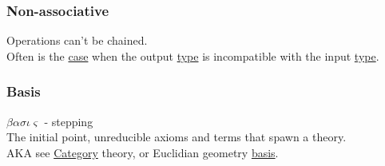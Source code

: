 \documentclass[a4paper,14pt,oneside]{book}
\begin{document}
\subsubsection{\label{org3eada59}Non-associative}
\label{sec:org4a4b299}
Operations can't be chained.\\

Often is the \hyperref[orgcafada5]{case} when the output \hyperref[orgdbcea73]{type} is incompatible with the input \hyperref[orgdbcea73]{type}.\\

\subsubsection{\label{org2273500}Basis}
\label{sec:org0298551}
\(\beta\alpha\sigma\iota\varsigma\) - stepping\\

The initial point, unreducible axioms and terms that spawn a theory.\\
AKA see \hyperref[org74d6ac5]{Category} theory, or Euclidian geometry \hyperref[org2273500]{basis}.\\
\end{document}

